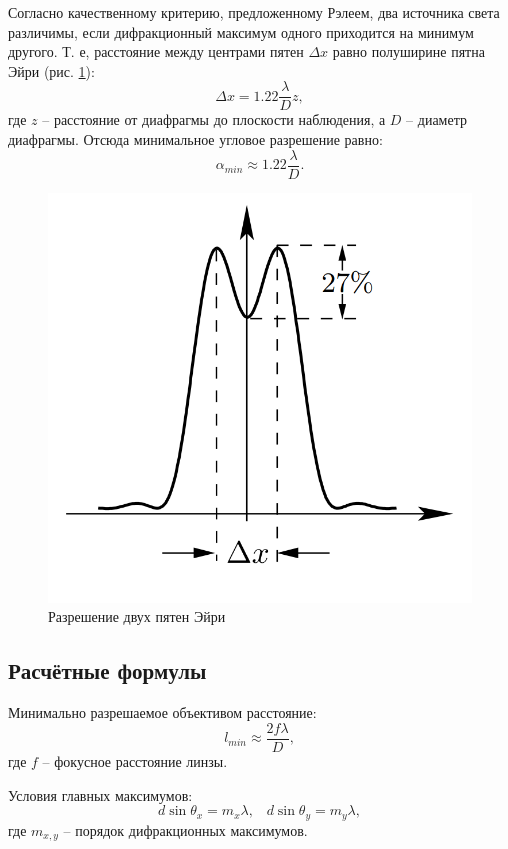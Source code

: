 \documentclass[a4paper]{article}
\begin{document}
Согласно качественному критерию, предложенному Рэлеем, два источника света различимы, если дифракционный максимум одного приходится на минимум другого. Т. е, расстояние между центрами пятен $ \Delta x $ равно полуширине пятна Эйри (рис. \ref{fig:screenshot2}): \[\Delta x = 1.22 \frac{\lambda}{D} z,\] где $ z $ -- расстояние от диафрагмы до плоскости наблюдения, а $ D $ -- диаметр диафрагмы. Отсюда минимальное угловое разрешение равно: \[\alpha_{min} \approx 1.22 \frac{\lambda}{D}.\]

\begin{figure}[tbp]
	\centering
	\includegraphics[width=0.8\linewidth]{Screenshot_2}
	\caption{Разрешение двух пятен Эйри}
	\label{fig:screenshot2}
\end{figure}


\subsection{Расчётные формулы}

Минимально разрешаемое объективом расстояние:
\begin{equation}\label{минимальное_расстояние}
	l_{min}\approx \frac{2 f \lambda}{D},
\end{equation}
где $ f $ -- фокусное расстояние линзы.

Условия главных максимумов:
\begin{equation}\label{условие_максимумов}
	d \sin \theta_x = m_x \lambda, \;\;\;	d \sin \theta_y = m_y \lambda,
\end{equation}
где $ m_{x, y} $ -- порядок дифракционных максимумов.
\end{document}
